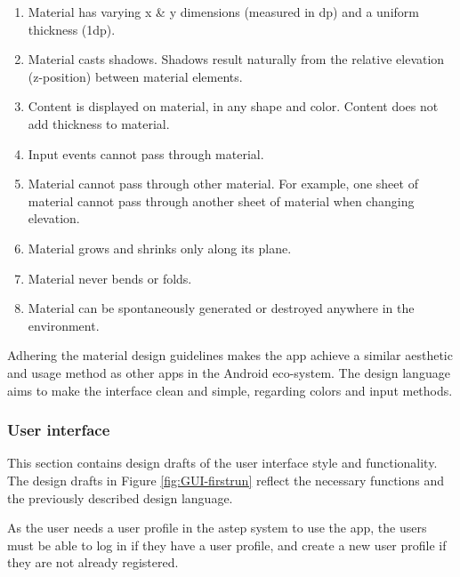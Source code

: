 \begin{enumerate}
	\item Material has varying x \& y dimensions (measured in dp) and a uniform thickness (1dp).
	\item Material casts shadows. Shadows result naturally from the relative elevation (z-position) between material elements.
	\item Content is displayed on material, in any shape and color. Content does not add thickness to material.
	\item Input events cannot pass through material.
	\item Material cannot pass through other material. For example, one sheet of material cannot pass through another sheet of material when changing elevation.
	\item Material grows and shrinks only along its plane.
	\item Material never bends or folds.
	\item Material can be spontaneously generated or destroyed anywhere in the environment.
\end{enumerate} 

Adhering the material design guidelines makes the app achieve a similar aesthetic and usage method as other apps in the Android eco-system. 
The design language aims to make the interface clean and simple, regarding colors and input methods.

\subsubsection{User interface}
This section contains design drafts of the user interface style and functionality.
The design drafts in Figure \ref{fig:GUI-firstrun} reflect the necessary functions and the previously described design language. 

As the user needs a user profile in the \gls{astep} system to use the app, the users must be able to log in if they have a user profile, and create a new user profile if they are not already registered.

